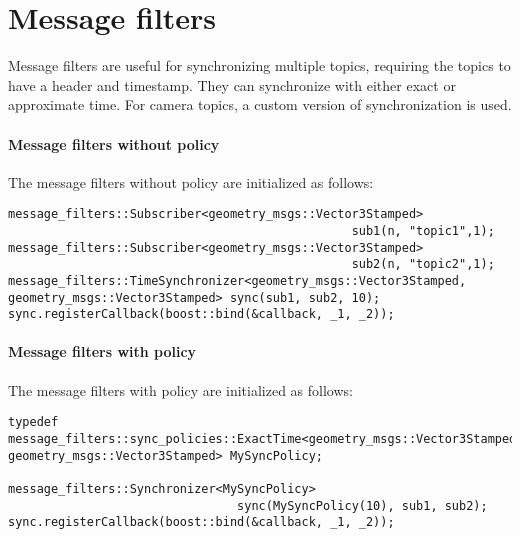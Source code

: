 \section{Message filters}

Message filters are useful for synchronizing multiple topics, requiring the topics to have a header and timestamp. 
They can synchronize with either exact or approximate time. 
For camera topics, a custom version of synchronization is used.

\paragraph*{Message filters without policy}
The message filters without policy are initialized as follows: 
\begin{verbatim}
message_filters::Subscriber<geometry_msgs::Vector3Stamped> 
                                                sub1(n, "topic1",1);
message_filters::Subscriber<geometry_msgs::Vector3Stamped> 
                                                sub2(n, "topic2",1);
message_filters::TimeSynchronizer<geometry_msgs::Vector3Stamped,
geometry_msgs::Vector3Stamped> sync(sub1, sub2, 10);
sync.registerCallback(boost::bind(&callback, _1, _2));
\end{verbatim}

\paragraph*{Message filters with policy}
The message filters with policy are initialized as follows: 
\begin{verbatim}
typedef
message_filters::sync_policies::ExactTime<geometry_msgs::Vector3Stamped,
geometry_msgs::Vector3Stamped> MySyncPolicy;

message_filters::Synchronizer<MySyncPolicy> 
                                sync(MySyncPolicy(10), sub1, sub2);
sync.registerCallback(boost::bind(&callback, _1, _2));
\end{verbatim}